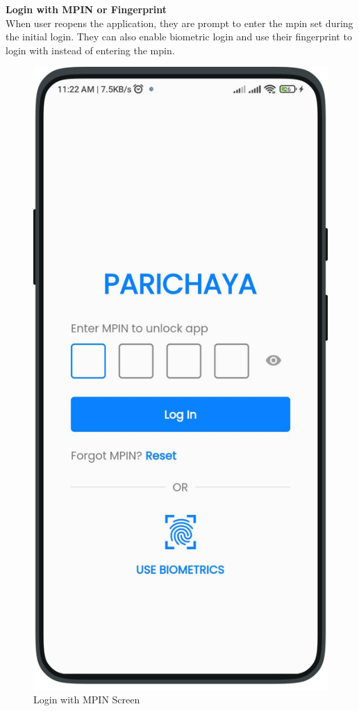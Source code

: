 \newpage
\textbf{Login with MPIN or Fingerprint}\\
    When user reopens the application, they are prompt to enter the mpin set during the initial login. They can also enable biometric login and use their fingerprint to login with instead of entering the mpin.
       \begin{figure}[H]
        \centering
        \includegraphics[width=0.3\linewidth]{images/results/mobile/LoginScreen.png}
        \caption[Login with MPIN Screen]{Login with MPIN Screen}
        \label{fig:LoginScreen.png}
        \end{figure}
    

